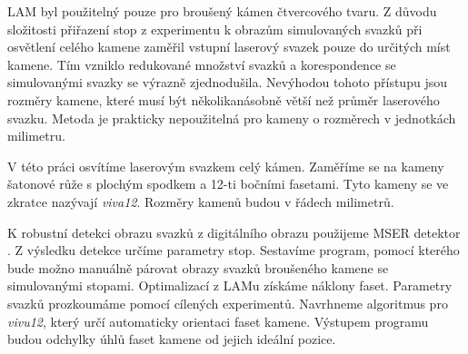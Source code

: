 LAM byl použitelný pouze pro broušený kámen čtvercového tvaru. Z důvodu složitosti přiřazení stop z experimentu k obrazům simulovaných svazků při osvětlení celého kamene zaměřil vstupní laserový svazek pouze do určitých míst kamene. Tím vzniklo redukované množství svazků a korespondence se simulovanými svazky se výrazně zjednodušila. Nevýhodou tohoto přístupu jsou rozměry kamene, které musí být několikanásobně větší než průměr laserového svazku. Metoda je prakticky nepoužitelná pro kameny o rozměrech v jednotkách milimetru. 

	V této práci osvítíme laserovým svazkem celý kámen. Zaměříme se na kameny šatonové růže s plochým spodkem a 12-ti bočními fasetami. Tyto kameny se ve zkratce nazývají \textit{viva12}. Rozměry kamenů budou v řádech milimetrů. 
	
	K robustní detekci obrazu svazků z digitálního obrazu použijeme MSER detektor \cite{Matas}. Z výsledku detekce určíme parametry stop. Sestavíme program, pomocí kterého bude možno manuálně párovat obrazy svazků broušeného kamene se simulovanými stopami.
 Optimalizací z LAMu získáme náklony faset. Parametry svazků prozkoumáme pomocí cílených experimentů. Navrhneme algoritmus pro \textit{vivu12}, který určí automaticky orientaci faset kamene. Výstupem programu budou odchylky úhlů faset kamene od jejich ideální pozice.

















